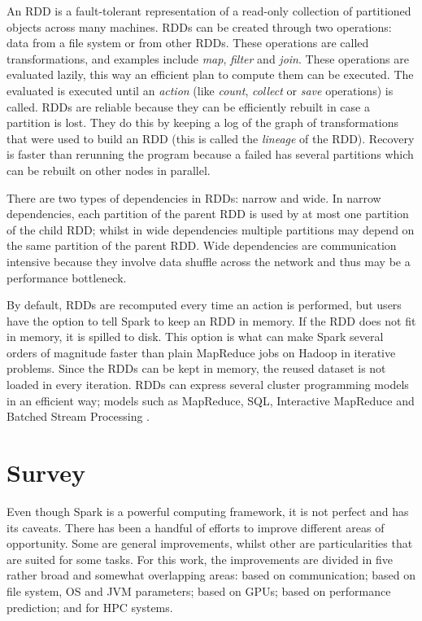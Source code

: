 \documentclass{article}
\begin{document}
An RDD is a fault-tolerant representation of a read-only collection of partitioned objects across many machines. RDDs can be created through two operations: data from a file system or from other RDDs. These operations are called transformations, and examples include \textit{map}, \textit{filter} and \textit{join}. These operations are evaluated lazily, this way an efficient plan to compute them can be executed. The evaluated is executed until an \textit{action} (like \textit{count}, \textit{collect} or \textit{save} operations) is called. RDDs are reliable because they can be efficiently rebuilt in case a partition is lost. They do this by keeping a log of the graph of transformations that were used to build an RDD (this is called the \textit{lineage} of the RDD). Recovery is faster than rerunning the program because a failed has several partitions which can be rebuilt on other nodes in parallel.

There are two types of dependencies in RDDs: narrow and wide. In narrow dependencies, each partition of the parent RDD is used by at most one partition of the child RDD; whilst in wide dependencies multiple partitions may depend on the same partition of the parent RDD. Wide dependencies are communication intensive because they involve data shuffle across the network and thus may be a performance bottleneck.

By default, RDDs are recomputed every time an action is performed, but users have the option to tell Spark to keep an RDD in memory. If the RDD does not fit in memory, it is spilled to disk. This option is what can make Spark several orders of magnitude faster than plain MapReduce jobs on Hadoop in iterative problems. Since the RDDs can be kept in memory, the reused dataset is not loaded in every iteration. RDDs can express several cluster programming models in an efficient way; models such as MapReduce, SQL, Interactive MapReduce and Batched Stream Processing \cite{zaharia_resilient_2012}.



\section{Survey}
\label{sec:survey}

Even though Spark is a powerful computing framework, it is not perfect and has its caveats. There has been a handful of efforts to improve different areas of opportunity. Some are general improvements, whilst other are particularities that are suited for some tasks. For this work, the improvements are divided in five rather broad and somewhat overlapping areas: based on communication; based on file system, OS and JVM parameters; based on GPUs; based on performance prediction; and for HPC systems.
\end{document}

